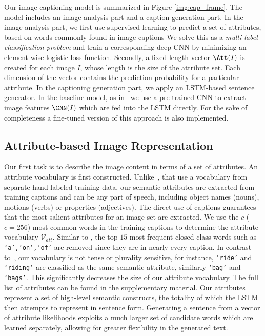 Our image captioning model is summarized in Figure \ref{img:cap_frame}. The model includes an image analysis part and a caption generation part. In the image analysis part, we first use supervised learning to predict a set of attributes, based on words commonly found in image captions %
We solve this as a \textit{multi-label classification problem} and train a corresponding deep CNN by minimizing an element-wise logistic loss function. Secondly, a fixed length vector $\Att(I)$ is created for each image $I$, whose length is the size of the attribute set. Each dimension of the vector contains the prediction probability for a particular attribute. In the captioning generation part, we apply an LSTM-based sentence generator. In the baseline model, as in~\cite{gao2015you,ren2015image,vinyals2014show} we use a pre-trained CNN to extract image features $\CNN(I)$ which are fed into the LSTM directly. For the sake of completeness a fine-tuned version of this approach is also implemented.

\subsection{Attribute-based Image Representation}
\label{subsec:Attributes_Predictor}
Our first task is to describe the image content in terms of a set of attributes. An attribute vocabulary is first constructed. Unlike~\cite{kulkarni2013babytalk,yang2011corpus}, that use a vocabulary from separate hand-labeled training data, our semantic attributes are extracted from training captions and can be any part of speech, including object names (nouns), motions (verbs) or properties (adjectives). The direct use of captions guarantees that the most salient attributes for an image set are extracted. We use the $c$ ($c=256$) most common words in the training captions to determine the attribute vocabulary $\mathcal{V}_{att}$. Similar to \cite{fang2014captions}, the top $15$ most frequent closed-class words such as \texttt{`a',`on',`of'}  are removed since they are in nearly every caption. In contrast to~\cite{fang2014captions}, our vocabulary is not tense or plurality sensitive, for instance, \texttt{`ride'} and \texttt{`riding'} are classified as the same semantic attribute, similarly \texttt{`bag'} and \texttt{`bags'}. This significantly decreases the size of our attribute vocabulary. The full list of attributes can be found in the supplementary material. Our attributes represent a set of high-level semantic constructs, the totality of which the LSTM then attempts to represent in sentence form. Generating a sentence from a vector of attribute likelihoods exploits a much larger set of candidate words which are learned separately, allowing for greater flexibility in the generated text.


